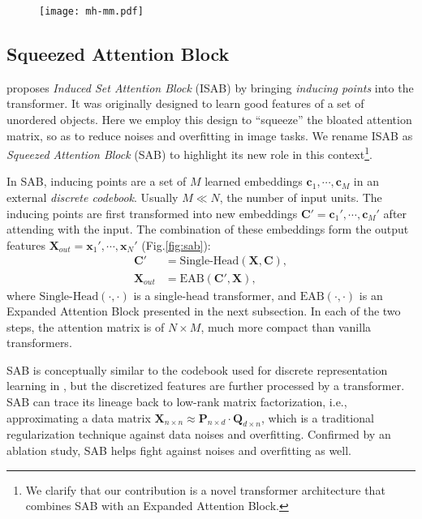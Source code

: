 \documentclass{article}
\begin{document}
\begin{figure}[t]
\centering
  \texttt{[image: mh-mm.pdf]}
  \label{fig:eab}
\end{figure}

\subsection{Squeezed Attention Block}
\cite{set-trans} proposes \emph{Induced Set Attention Block} (ISAB) by bringing \emph{inducing points} into the transformer. It was originally designed to learn good features of a set of unordered objects. Here we employ this design to ``squeeze'' the bloated attention matrix, so as to reduce noises and overfitting in image tasks. We rename ISAB as \emph{Squeezed Attention Block} (SAB) to highlight its new role in this context\footnote{We clarify that our contribution is a novel transformer architecture that combines SAB with an Expanded Attention Block.}.

In SAB, inducing points are a set of $M$ learned embeddings $\boldsymbol{c}_1,\cdots,\boldsymbol{c}_M$ in an external \emph{discrete codebook}. Usually $M \ll N$, the number of input units. The inducing points are first transformed into new embeddings $\boldsymbol{C}' = \boldsymbol{c}_1',\cdots,\boldsymbol{c}_M'$ after attending with the input. The combination of these embeddings form the output features $\boldsymbol{X}_{out} = \boldsymbol{x}_1',\cdots,\boldsymbol{x}_N'$ (Fig.\ref{fig:sab}):
\begin{align}
\boldsymbol{C}' &= \text{Single-Head}(\boldsymbol{X}, \boldsymbol{C}), \\
\boldsymbol{X}_{out} &= \text{EAB}(\boldsymbol{C}', \boldsymbol{X}),
\end{align}
where $\text{Single-Head}(\cdot,\cdot)$ is a single-head transformer, and $\text{EAB}(\cdot,\cdot)$ is an Expanded Attention Block presented in the next subsection.
In each of the two steps, the attention matrix is of $N\times M$, much more compact than vanilla transformers. 

SAB is conceptually similar to the codebook used for discrete representation learning in \cite{taming}, but 
the discretized features are further processed by a transformer.
SAB can trace its lineage back to low-rank matrix factorization, i.e., approximating a data matrix $\boldsymbol{X}_{n\times n}\approx \boldsymbol{P}_{n\times d} \cdot \boldsymbol{Q}_{d\times n}$, which is a traditional regularization technique against data noises and overfitting. Confirmed by an ablation study, SAB helps fight against noises and overfitting as well.
\end{document}
